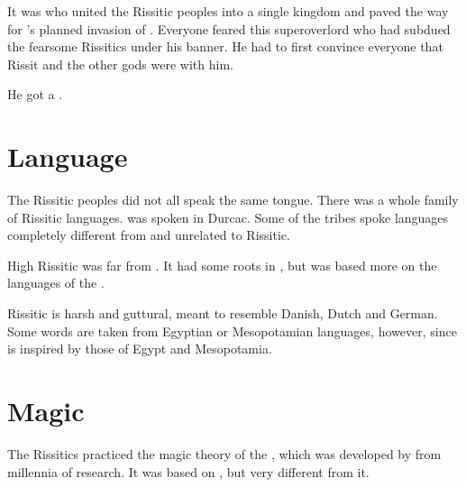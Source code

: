 It was  who united the Rissitic peoples into a single kingdom and paved the way for \Secherdamon's planned invasion of \Velcad.
Everyone feared this super\human overlord who had subdued the fearsome Rissitics under his banner. 
He had to first convince everyone that Rissit and the other gods were with him.

He got a . 

















\section{Language}
The Rissitic peoples did not all speak the same tongue.
There was a whole family of Rissitic languages. 
 was spoken in Durcac.
Some of the tribes spoke languages completely different from and unrelated to Rissitic.

High Rissitic was far from \Ortaican. 
It had some roots in \Ortaican, but was based more on the languages of the . 

Rissitic is harsh and guttural, meant to resemble Danish, Dutch and German. 
Some words are taken from Egyptian or Mesopotamian languages, however, since  is inspired by those of Egypt and Mesopotamia. 















\section{Magic}
The Rissitics practiced the magic theory of the , which was developed by \RissitNechsain{} from millennia of research. 
It was based on , but very different from it.

